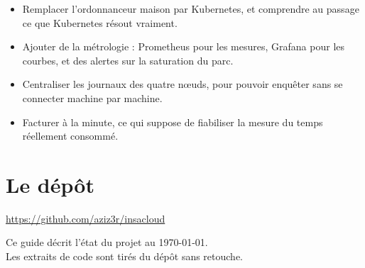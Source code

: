 \begin{itemize}
\item Remplacer l'ordonnanceur maison par Kubernetes, et comprendre au passage
  ce que Kubernetes résout vraiment.
\item Ajouter de la métrologie : Prometheus pour les mesures, Grafana pour les
  courbes, et des alertes sur la saturation du parc.
\item Centraliser les journaux des quatre nœuds, pour pouvoir enquêter sans se
  connecter machine par machine.
\item Facturer à la minute, ce qui suppose de fiabiliser la mesure du temps
  réellement consommé.
\end{itemize}

\section{Le dépôt}

\begin{center}
\url{https://github.com/aziz3r/insacloud}
\end{center}

\vspace{1cm}
\begin{center}
\color{gristexte}\small
Ce guide décrit l'état du projet au \today.\\
Les extraits de code sont tirés du dépôt sans retouche.
\end{center}
